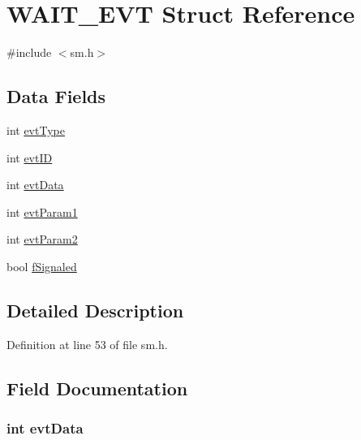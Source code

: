 \hypertarget{struct_w_a_i_t___e_v_t}{
\section{WAIT\_\-EVT Struct Reference}
\label{struct_w_a_i_t___e_v_t}
}


{\ttfamily \#include $<$sm.h$>$}

\subsection*{Data Fields}
\begin{DoxyCompactItemize}
\item 
int \hyperlink{struct_w_a_i_t___e_v_t_af779e05b97b617b213985a1eb1dad15c}{evtType}
\item 
int \hyperlink{struct_w_a_i_t___e_v_t_a8a07067cf3aa2e373d847ea8ee3024b4}{evtID}
\item 
int \hyperlink{struct_w_a_i_t___e_v_t_af5e0f43edae982ece7f883d28a6951ed}{evtData}
\item 
int \hyperlink{struct_w_a_i_t___e_v_t_a34a60177e5f7c11456362e94718087c1}{evtParam1}
\item 
int \hyperlink{struct_w_a_i_t___e_v_t_a19252a0b84c2fe22623226e6a1f5d587}{evtParam2}
\item 
bool \hyperlink{struct_w_a_i_t___e_v_t_a2ca427bbef249aafb0d2f944df33a74f}{fSignaled}
\end{DoxyCompactItemize}


\subsection{Detailed Description}


Definition at line 53 of file sm.h.



\subsection{Field Documentation}
\hypertarget{struct_w_a_i_t___e_v_t_af5e0f43edae982ece7f883d28a6951ed}{
\subsubsection[{evtData}]{\setlength{\rightskip}{0pt plus 5cm}int {\bf evtData}}}
\label{struct_w_a_i_t___e_v_t_af5e0f43edae982ece7f883d28a6951ed}


